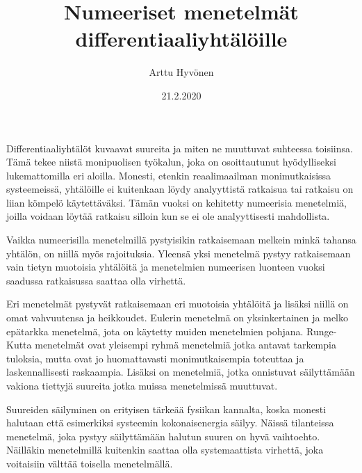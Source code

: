 \documentclass[12pt, finnish]{article}
\title{Numeeriset menetelmät differentiaaliyhtälöille} %
\author{Arttu Hyv\"onen} %
\date{21.2.2020}
\begin{document}
\maketitle %


Differentiaaliyhtälöt kuvaavat suureita ja miten ne muuttuvat suhteessa toisiinsa. Tämä tekee niistä monipuolisen työkalun, joka on osoittautunut hyödylliseksi lukemattomilla eri aloilla. Monesti, etenkin reaalimaailman monimutkaisissa systeemeissä, yhtälöille ei kuitenkaan löydy analyyttistä ratkaisua tai ratkaisu on liian kömpelö käytettäväksi. Tämän vuoksi on kehitetty numeerisia menetelmiä, joilla voidaan löytää ratkaisu silloin kun se ei ole analyyttisesti mahdollista.

Vaikka numeerisilla menetelmillä pystyisikin ratkaisemaan melkein minkä tahansa yhtälön, on niillä myös rajoituksia. Yleensä yksi menetelmä pystyy ratkaisemaan vain tietyn muotoisia yhtälöitä ja menetelmien numeerisen \linebreak[4] luonteen vuoksi saadussa ratkaisussa saattaa olla virhettä. 

Eri menetelmät pystyvät ratkaisemaan eri muotoisia yhtälöitä ja lisäksi niillä on omat vahvuutensa ja heikkoudet. Eulerin menetelmä on yksinkertainen ja melko epätarkka menetelmä, jota on käytetty muiden menetelmien \linebreak[1] pohjana. Runge-Kutta menetelmät ovat yleisempi ryhmä menetelmiä jotka antavat tarkempia tuloksia, mutta ovat jo huomattavasti monimutkaisempia toteuttaa ja laskennallisesti raskaampia. Lisäksi on menetelmiä, jotka onnistuvat säilyttämään vakiona tiettyjä suureita jotka muissa menetelmissä muuttuvat. 

Suureiden säilyminen on erityisen tärkeää fysiikan kannalta, koska \linebreak[4] monesti halutaan että esimerkiksi systeemin kokonaisenergia säilyy. Näissä tilanteissa menetelmä, joka pystyy säilyttämään halutun suuren on hyvä vaihtoehto. Näilläkin menetelmillä kuitenkin saattaa olla systemaattista virhettä, joka voitaisiin välttää toisella menetelmällä.


\thispagestyle{empty}
\end{document}
